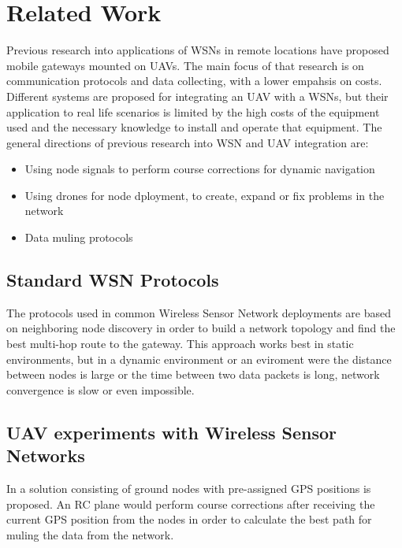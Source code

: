 \normalfont\normalsize
\chapter{Related Work}
\label{chap:related}

Previous research into applications of WSNs in remote locations have proposed mobile gateways mounted on UAVs. The main focus of that research is on communication protocols and data collecting, with a lower empahsis on costs. Different systems are proposed for integrating an UAV with a WSNs, but their application to real life scenarios is limited by the high costs of the equipment used and the necessary knowledge to install and operate that equipment.
The general directions of previous research into WSN and UAV integration are:
\begin{itemize}

\item Using node signals to perform course corrections for dynamic navigation
\item Using drones for node dployment, to create, expand or fix problems in the network \cite{akyildiz2002wireless}
\item Data muling protocols

\end{itemize}

\section{Standard WSN Protocols}

The protocols used in common Wireless Sensor Network deployments are based on neighboring node discovery in order to build a network topology and find the best multi-hop route to the gateway. This approach works best in static environments, but in a dynamic environment or an eviroment were the distance between nodes is large or the time between two data packets is long, network convergence is slow or even impossible.

\section{UAV experiments with Wireless Sensor Networks}

In \cite{teh2008experiments} a solution consisting of ground nodes with pre-assigned GPS positions is proposed. An RC plane would perform course corrections after receiving the current GPS position from the nodes in order to calculate the best path for muling the data from the network.

